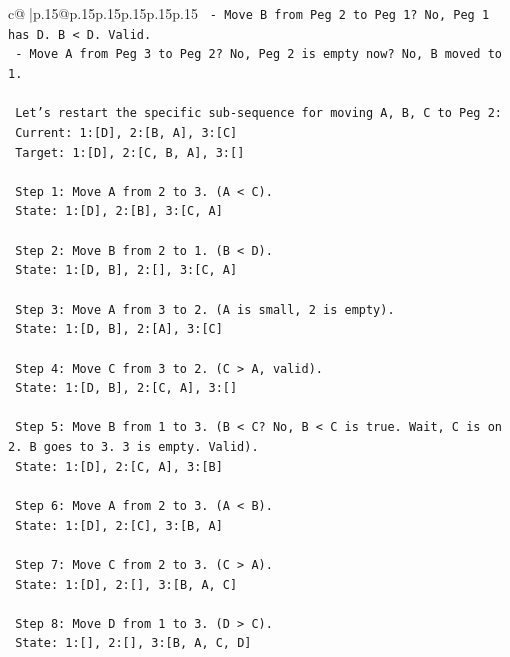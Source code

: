 \documentclass{article}
\begin{document}
{\begin{supertabular}{c@{$\;$}|p{.15\linewidth}@{}p{.15\linewidth}p{.15\linewidth}p{.15\linewidth}p{.15\linewidth}p{.15\linewidth}}
{{{\texttt{   {-} Move B from Peg 2 to Peg 1? No, Peg 1 has D. B < D. Valid.} \\
\texttt{   {-} Move A from Peg 3 to Peg 2? No, Peg 2 is empty now? No, B moved to 1.} \\
\\ 
\texttt{   Let's restart the specific sub{-}sequence for moving A, B, C to Peg 2:} \\
\texttt{   Current: 1:{[}D{]}, 2:{[}B, A{]}, 3:{[}C{]}} \\
\texttt{   Target: 1:{[}D{]}, 2:{[}C, B, A{]}, 3:{[}{]}} \\
\\ 
\texttt{   Step 1: Move A from 2 to 3. (A < C).} \\
\texttt{   State: 1:{[}D{]}, 2:{[}B{]}, 3:{[}C, A{]}} \\
\\ 
\texttt{   Step 2: Move B from 2 to 1. (B < D).} \\
\texttt{   State: 1:{[}D, B{]}, 2:{[}{]}, 3:{[}C, A{]}} \\
\\ 
\texttt{   Step 3: Move A from 3 to 2. (A is small, 2 is empty).} \\
\texttt{   State: 1:{[}D, B{]}, 2:{[}A{]}, 3:{[}C{]}} \\
\\ 
\texttt{   Step 4: Move C from 3 to 2. (C > A, valid).} \\
\texttt{   State: 1:{[}D, B{]}, 2:{[}C, A{]}, 3:{[}{]}} \\
\\ 
\texttt{   Step 5: Move B from 1 to 3. (B < C? No, B < C is true. Wait, C is on 2. B goes to 3. 3 is empty. Valid).} \\
\texttt{   State: 1:{[}D{]}, 2:{[}C, A{]}, 3:{[}B{]}} \\
\\ 
\texttt{   Step 6: Move A from 2 to 3. (A < B).} \\
\texttt{   State: 1:{[}D{]}, 2:{[}C{]}, 3:{[}B, A{]}} \\
\\ 
\texttt{   Step 7: Move C from 2 to 3. (C > A).} \\
\texttt{   State: 1:{[}D{]}, 2:{[}{]}, 3:{[}B, A, C{]}} \\
\\ 
\texttt{   Step 8: Move D from 1 to 3. (D > C).} \\
\texttt{   State: 1:{[}{]}, 2:{[}{]}, 3:{[}B, A, C, D{]}} \\
\\ 
}}}
\end{supertabular}}
\end{document}

